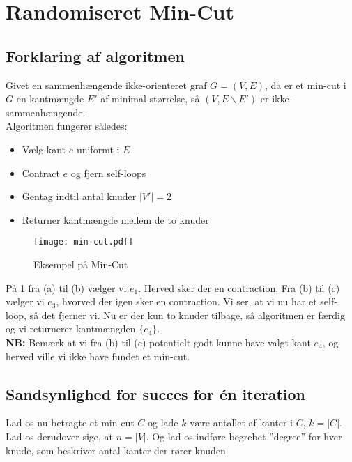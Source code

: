 \section{Randomiseret Min-Cut}
\subsection{Forklaring af algoritmen}

Givet en sammenhængende ikke-orienteret graf $G = (V, E)$, da er et min-cut i $G$ en kantmængde $E'$ af minimal størrelse, så $(V, E \backslash E')$ er ikke-sammenhængende.\\

Algoritmen fungerer således:
\begin{itemize}
	\item Vælg kant $e$ uniformt i $E$
	\item Contract $e$ og fjern self-loops
	\item Gentag indtil antal knuder $|V'| = 2$
	\item Returner kantmængde mellem de to knuder
\end{itemize}

\begin{figure}[H]
	\begin{center}
		\texttt{[image: min-cut.pdf]}
	\end{center}
	\caption{Eksempel på Min-Cut}
	\label{fig:min-cut}
\end{figure}

På \ref{fig:min-cut} fra (a) til (b) vælger vi $e_1$. Herved sker der en contraction. Fra (b) til (c) vælger vi $e_3$, hvorved der igen sker en contraction. Vi ser, at vi nu har et self-loop, så det fjerner vi. Nu er der kun to knuder tilbage, så algoritmen er færdig og vi returnerer kantmængden $\{e_4\}$.\\

\textbf{NB:} Bemærk at vi fra (b) til (c) potentielt godt kunne have valgt kant $e_4$, og herved ville vi ikke have fundet et min-cut.





\subsection{Sandsynlighed for succes for én iteration}
Lad os nu betragte et min-cut $C$ og lade $k$ være antallet af kanter i $C$, $k = |C|$. Lad os derudover sige, at $n = |V|$. Og lad os indføre begrebet ''degree'' for hver knude, som beskriver antal kanter der rører knuden.\\

